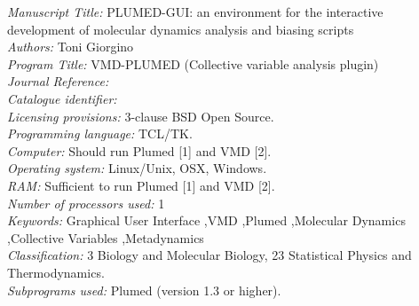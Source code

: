 \documentclass[preprint,12pt]{elsarticle}
\newcounter{bla}
\newcommand{\mytitle}{PLUMED-GUI: an environment for the interactive development 
  of molecular dynamics analysis and biasing scripts}
\newcommand{\mykeywords}{Graphical User Interface \sep VMD \sep Plumed \sep Molecular Dynamics \sep Collective Variables \sep Metadynamics}
\begin{document}
\begin{small}
\noindent
{\em Manuscript Title:}                                       
 \mytitle \\
{\em Authors:}                                                
 Toni Giorgino \\
{\em Program Title:}                                          
 VMD-PLUMED (Collective variable analysis plugin) \\
{\em Journal Reference:}                                      \\
{\em Catalogue identifier:}                                   \\
{\em Licensing provisions:}                                   
 3-clause BSD Open Source. \\
{\em Programming language:}                                   
 TCL/TK. \\
{\em Computer:}                                               
 Should run  Plumed [1] and VMD [2]. \\
{\em Operating system:}                                       
 Linux/Unix, OSX, Windows. \\
{\em RAM:}                                               
 Sufficient to run Plumed [1] and VMD [2]. \\
{\em Number of processors used:}                              
 1 \\
{\em Keywords:} \mykeywords \\
{\em Classification:}                                         
  3 Biology and Molecular Biology, 23 Statistical Physics and Thermodynamics. \\
{\em Subprograms used:}                                       
  Plumed (version 1.3 or higher). \\

\end{small}
\end{document}
